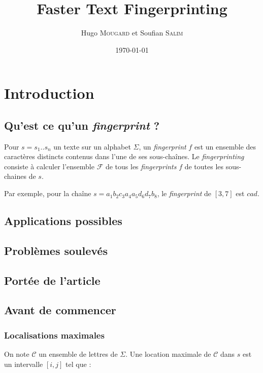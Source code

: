 \documentclass[a4paper]{article}
\title{Faster Text Fingerprinting}
\author{Hugo \textsc{Mougard} et Soufian \textsc{Salim}}
\date{\today}
\begin{document}
\maketitle

\tableofcontents

\section{Introduction}

\subsection{Qu'est ce qu'un \textit{fingerprint} ?}

Pour $s = s_{1} .. s_{n}$ un texte sur un alphabet $\Sigma$, un \textit{fingerprint} $f$ est un ensemble des caractères distincts contenus dans l'une de ses sous-chaînes. Le \textit{fingerprinting} consiste à calculer l'ensemble $\mathcal{F}$ de tous les \textit{fingerprints} $f$ de toutes les sous-chaines de $s$.  \newline

Par exemple, pour la chaîne $s = a_{1} b_{2} c_{3} a_{4} a_{5} d_{6} d_{7} b_{8}$, le \textit{fingerprint} de $[3,7]$ est $cad$.

\subsection{Applications possibles}

\subsection{Problèmes soulevés}

\subsection{Portée de l'article}

\subsection{Avant de commencer}

\subsubsection{Localisations maximales}

On note $\mathcal{C}$ un ensemble de lettres de $\Sigma$. Une location maximale de $\mathcal{C}$ dans $s$ est un intervalle $[i,j]$ tel que :
		
\end{document}
